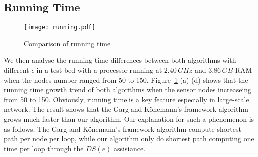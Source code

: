 \documentclass{article}
\begin{document}
\subsection{Running Time}

\begin{figure}[H]
\centering
\texttt{[image: running.pdf]} 
\caption{Comparison of running time}
\label{f2}
\end{figure}
We then analyse the running time differences between both algorithms with different $\epsilon$ in a test-bed with a processor running at $2.40\,GHz$ and $3.86\,GB$ RAM when the nodes number ranged from 50 to 150.
Figure~\ref{f2} (a)-(d) shows that the running time growth trend of both algorithms when the sensor nodes increaseing from 50 to 150. Obviously, running time is a key feature especially in large-scale network. The result shows that the Garg and K\"{o}nemann's framework algorithm 
grows much faster than our algorithm. Our explanation for such a phenomenon is as follows. The Garg and K\"{o}nemann's framework algorithm compute shortest path per node per loop, while our algorithm only do shortest path computing one time per loop through the $DS(e)$ assistance. 




\end{document}

